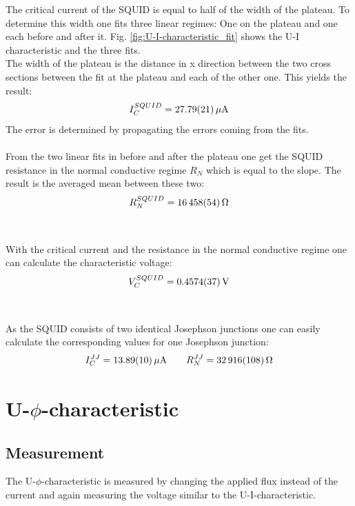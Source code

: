 \documentclass[12pt,a4paper]{article}
\begin{document}
The critical current of the SQUID is equal to half of the width of the plateau. To determine this width one fits three linear regimes: One on the plateau and one each before and after it. Fig. \ref{fig:U-I-characteristic_fit} shows the U-I characteristic and the three fits. \\
The width of the plateau is the distance in x direction between the two cross sections between the fit at the plateau and each of the other one. This yields the result:
\begin{equation*}
I_C^{SQUID} = \SI{27.79 \pm 0.21}{\mu A}
\end{equation*}
The error is determined by propagating the errors coming from the fits. \\
\\
From the two linear fits in before and after the plateau one get the SQUID resistance in the normal conductive regime $R_N$ which is equal to the slope. The result is the averaged mean between these two:
\begin{equation*}
R_N^{SQUID} = \SI{16458 \pm 54}{\Omega}
\end{equation*}\\
\\
With the critical current and the resistance in the normal conductive regime one can calculate the characteristic voltage:
\begin{equation*}
V_C^{SQUID} = \SI{0.4574 \pm 0.0037}{V}
\end{equation*}\\
\\
As the SQUID consists of two identical Josephson junctions one can easily calculate the corresponding values for one Josephson junction:
\begin{equation*}
I_C^{JJ} = \SI{13.89 \pm 0.10}{\mu A} \qquad R_N^{JJ} = \SI{32916 \pm 108}{\Omega}
\end{equation*}


\section{U-$\si{\phi}$-characteristic}

\subsection{Measurement}
The U-$\si{\phi}$-characteristic is measured by changing the applied flux instead of the current and again measuring the voltage similar to the U-I-characteristic.
\end{document}
